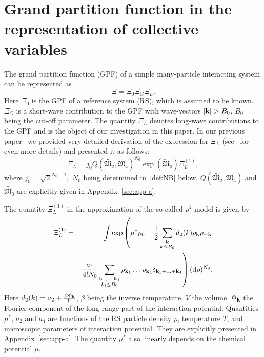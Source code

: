 \section{\label{sec:init-gpf} Grand partition function in the representation of collective variables}
The grand partition function (GPF) of a simple many-particle interacting system can be represented as~\cite{Yukh1990,YukhJSP1995,RomaJPS2024}
\begin{equation}
	\label{Xi_as_prod}
	\Xi = \Xi_0\Xi_G\Xi_L.
\end{equation}
Here $\Xi_0$ is the GPF of a reference system (RS), which is assumed to be known. $\Xi_G$ is a short-wave contribution to the GPF with wave-vectors $\abs{\vb{k}}>B_0$, $B_0$ being the cut-off parameter.
The quantity $\Xi_L$ denotes long-wave contributions to the GPF and is the object of our investigation in this paper. In our previous paper~\cite{RomaJPS2024} we provided very detailed derivation of the expression for $\Xi_L$ (see~\cite{Roma2023Preprint} for even more details) and presented it as follows:
\begin{equation}
	\label{Xi_L}
	\Xi_L = j_0Q(\tilde{\mathfrak{M}_2}, \mathfrak{M}_4)^{N_0} \exp(\tilde{\mathfrak{M}}_0) \Xi_L^{(1)},
\end{equation} 
where $j_0=\sqrt{2}^{N_0 - 1},$ $N_0$ being determined in~\eqref{def:NB} below, $Q(\tilde{\mathfrak{M}_2}, \mathfrak{M}_4)$ and $\tilde{\mathfrak{M}_0}$ are explicitly given in Appendix~\ref{sec:app-a}.

The quantity $\Xi_L^{(1)}$ in the approximation of the so-called $\rho^4$ model is given by
\begin{eqnarray}
	\label{Xi_L_1}
	\Xi_L^{(1)} &=& 
	\int \exp\left(
	\mu^* \rho_0 - \frac{1}{2} \sum_{\substack{\vb k \\ k \leq B_0}} d_2(k) \rho_{\vb k} \rho_{-\vb k} 
	\right.\\
	& - & \left. \frac{a_4}{4! N_0} \sum_{\substack{\vb k_1, \dotsc, \vb k_4 \\ k_i \leq B_0}} \rho_{\vb k_1} \dotsc \rho_{\vb k_4} \delta_{\vb{k}_1 + \dotsc + \vb{k}_4} \right) ({\rm d} \rho)^{N_0}
	\nonumber.
\end{eqnarray}
Here $d_2(k) = a_2 + \frac{\beta\hat{\Phi}_{\vb k}}{V}$, $\beta$ being the inverse temperature, $V$ the volume, $\hat{\Phi}_{\vb k}$ the Fourier component of the long-range part of the interaction potential.
Quantities $\mu^*$, $a_2$ and $a_4$ are functions of the RS particle density $\rho$, temperature $T$, and microscopic parameters of interaction potential. They are explicitly presented in Appendix~\ref{sec:app-a}. The quantity $\mu^*$ also linearly depends on the chemical potential $\mu$.

